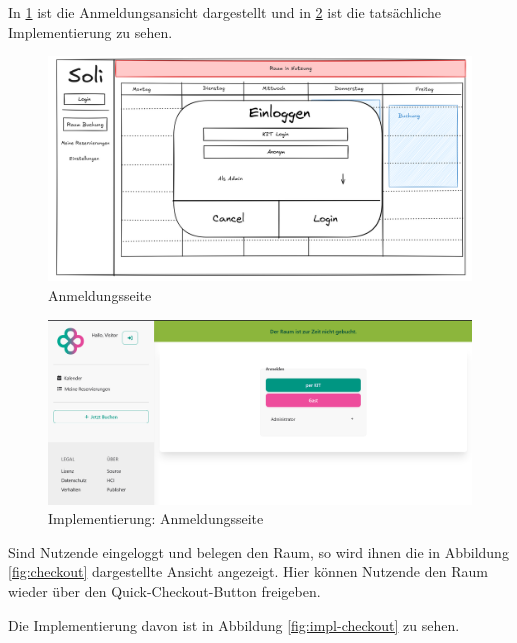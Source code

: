 In \ref{fig:login} ist die Anmeldungsansicht dargestellt und in \ref{fig:impl-login} ist die tatsächliche Implementierung zu sehen.

\begin{figure}[ht]
    \centering
    \includegraphics[width=\textwidth]{figures/mockup/auth_login}
    \caption{Anmeldungsseite}
    \label{fig:login}
\end{figure}
\clearpage

\begin{figure}[ht]
    \centering
    \includegraphics[width=\textwidth]{figures/impl-views/auth_login}
    \caption{Implementierung: Anmeldungsseite}
    \label{fig:impl-login}
\end{figure}
\clearpage

Sind Nutzende eingeloggt und belegen den Raum,
so wird ihnen die in Abbildung \ref{fig:checkout} dargestellte Ansicht angezeigt.
Hier können Nutzende den Raum wieder über den Quick-Checkout-Button freigeben.

Die Implementierung davon ist in Abbildung \ref{fig:impl-checkout} zu sehen.


